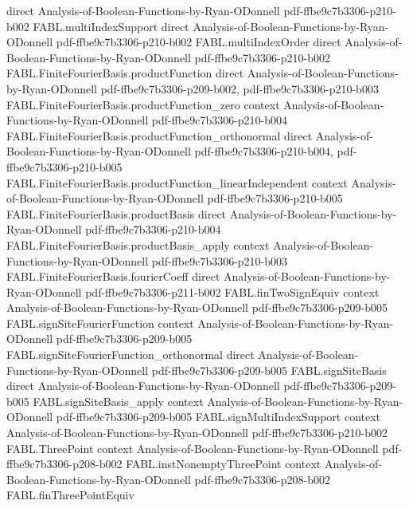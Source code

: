 \begin{theorem}
  {direct}
  {Analysis-of-Boolean-Functions-by-Ryan-ODonnell}
  {pdf-ffbe9c7b3306-p210-b002}
\proofstep
  {FABL.multiIndexSupport}
  {direct}
  {Analysis-of-Boolean-Functions-by-Ryan-ODonnell}
  {pdf-ffbe9c7b3306-p210-b002}
\proofstep
  {FABL.multiIndexOrder}
  {direct}
  {Analysis-of-Boolean-Functions-by-Ryan-ODonnell}
  {pdf-ffbe9c7b3306-p210-b002}
\proofstep
  {FABL.FiniteFourierBasis.productFunction}
  {direct}
  {Analysis-of-Boolean-Functions-by-Ryan-ODonnell}
  {pdf-ffbe9c7b3306-p209-b002,
    pdf-ffbe9c7b3306-p210-b003}
\proofstep
  {FABL.FiniteFourierBasis.productFunction_zero}
  {context}
  {Analysis-of-Boolean-Functions-by-Ryan-ODonnell}
  {pdf-ffbe9c7b3306-p210-b004}
\proofstep
  {FABL.FiniteFourierBasis.productFunction_orthonormal}
  {direct}
  {Analysis-of-Boolean-Functions-by-Ryan-ODonnell}
  {pdf-ffbe9c7b3306-p210-b004,
    pdf-ffbe9c7b3306-p210-b005}
\proofstep
  {FABL.FiniteFourierBasis.productFunction_linearIndependent}
  {context}
  {Analysis-of-Boolean-Functions-by-Ryan-ODonnell}
  {pdf-ffbe9c7b3306-p210-b005}
\proofstep
  {FABL.FiniteFourierBasis.productBasis}
  {direct}
  {Analysis-of-Boolean-Functions-by-Ryan-ODonnell}
  {pdf-ffbe9c7b3306-p210-b004}
\proofstep
  {FABL.FiniteFourierBasis.productBasis_apply}
  {context}
  {Analysis-of-Boolean-Functions-by-Ryan-ODonnell}
  {pdf-ffbe9c7b3306-p210-b003}
\proofstep
  {FABL.FiniteFourierBasis.fourierCoeff}
  {direct}
  {Analysis-of-Boolean-Functions-by-Ryan-ODonnell}
  {pdf-ffbe9c7b3306-p211-b002}
\proofstep
  {FABL.finTwoSignEquiv}
  {context}
  {Analysis-of-Boolean-Functions-by-Ryan-ODonnell}
  {pdf-ffbe9c7b3306-p209-b005}
\proofstep
  {FABL.signSiteFourierFunction}
  {context}
  {Analysis-of-Boolean-Functions-by-Ryan-ODonnell}
  {pdf-ffbe9c7b3306-p209-b005}
\proofstep
  {FABL.signSiteFourierFunction_orthonormal}
  {direct}
  {Analysis-of-Boolean-Functions-by-Ryan-ODonnell}
  {pdf-ffbe9c7b3306-p209-b005}
\proofstep
  {FABL.signSiteBasis}
  {direct}
  {Analysis-of-Boolean-Functions-by-Ryan-ODonnell}
  {pdf-ffbe9c7b3306-p209-b005}
\proofstep
  {FABL.signSiteBasis_apply}
  {context}
  {Analysis-of-Boolean-Functions-by-Ryan-ODonnell}
  {pdf-ffbe9c7b3306-p209-b005}
\proofstep
  {FABL.signMultiIndexSupport}
  {context}
  {Analysis-of-Boolean-Functions-by-Ryan-ODonnell}
  {pdf-ffbe9c7b3306-p210-b002}
\proofstep
  {FABL.ThreePoint}
  {context}
  {Analysis-of-Boolean-Functions-by-Ryan-ODonnell}
  {pdf-ffbe9c7b3306-p208-b002}
\proofstep
  {FABL.instNonemptyThreePoint}
  {context}
  {Analysis-of-Boolean-Functions-by-Ryan-ODonnell}
  {pdf-ffbe9c7b3306-p208-b002}
\proofstep
  {FABL.finThreePointEquiv}

\end{theorem}
